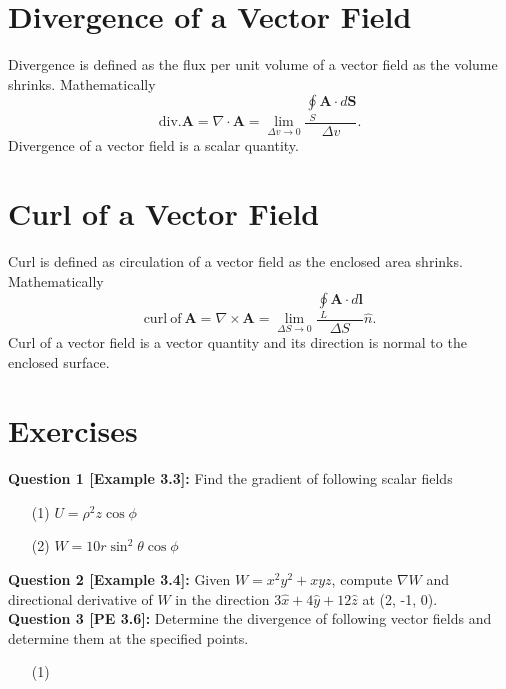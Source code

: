 \documentclass[12pt,a4paper]{article}
\begin{document}
\section{Divergence of a Vector Field}
Divergence is defined as the flux per unit volume of a vector field as the volume shrinks. Mathematically
\begin{equation}
\mathrm{div. \textbf{A}}=\nabla\cdot\mathrm{\textbf{A}}=\lim_{\Delta v \to 0}\dfrac{\oint\limits_S\mathrm{\textbf{A}}\cdot d\mathrm{\textbf{S}}}{\Delta v}.
\end{equation}
Divergence of a vector field is a scalar quantity.
\section{Curl of a Vector Field}
Curl is defined as circulation of a vector field as the enclosed area shrinks. Mathematically
\begin{equation}
\mathrm{curl~of~\textbf{A}}=\nabla\times\mathrm{\textbf{A}}=\lim_{\Delta S \to 0}\dfrac{\oint\limits_L\mathrm{\textbf{A}}\cdot d\mathrm{\textbf{l}}}{\Delta S}\hat n.
\end{equation}
Curl of a vector field is a vector quantity and its direction is normal to the enclosed surface.
\section{Exercises}
\noindent\textbf{Question 1 \cite{Sadiku}[Example 3.3]:} Find the gradient of following scalar fields
\begin{itemize}
\item[(1)] $U=\rho^2z\cos\phi$
\item[(2)] $W=10r\sin^2\theta\cos\phi$
\end{itemize}
\noindent\textbf{Question 2 \cite{Sadiku}[Example 3.4]:} Given $W=x^2y^2+xyz$, compute $\nabla W$ and directional derivative of $W$ in the direction $3\hat x+4\hat y+12\hat z$ at (2, -1, 0).\\[0.2cm]
\noindent\textbf{Question 3 \cite{Sadiku}[PE 3.6]:} Determine the divergence of following vector fields and determine them at the specified points.
\begin{itemize}
\item[(1)] 
\end{itemize}


\end{document}
